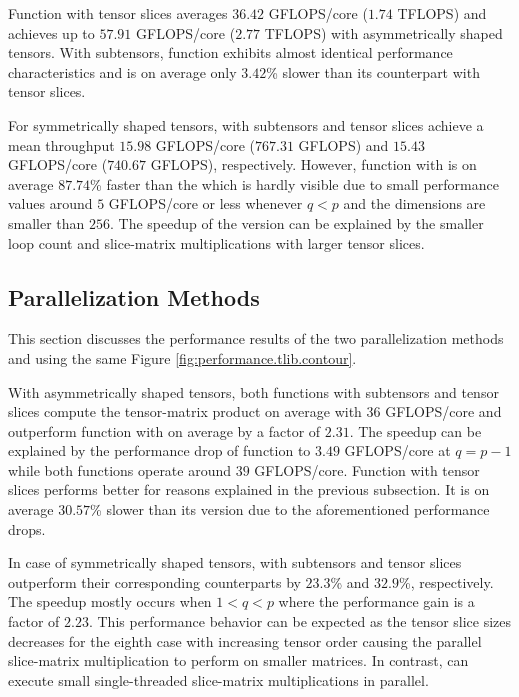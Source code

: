 Function  with tensor slices averages $36.42$ GFLOPS/core ($1.74$ TFLOPS) and achieves up to $57.91$ GFLOPS/core ($2.77$ TFLOPS) with asymmetrically shaped tensors.
With subtensors, function  exhibits almost identical performance characteristics and is on average only $3.42$\% slower than its counterpart with tensor slices.

For symmetrically shaped tensors,  with subtensors and tensor slices achieve a mean throughput $15.98$ GFLOPS/core ($767.31$ GFLOPS) and $15.43$ GFLOPS/core ($740.67$ GFLOPS), respectively.
However, function  with  is on average $87.74$\% faster than the  which is hardly visible due to small performance values around $5$ GFLOPS/core or less whenever $q<p$ and the dimensions are smaller than $256$.
The speedup of the  version can be explained by the smaller loop count and slice-matrix multiplications with larger tensor slices.


\subsection{Parallelization Methods}
This section discusses the performance results of the two parallelization methods  and  using the same Figure \ref{fig:performance.tlib.contour}.

With asymmetrically shaped tensors, both  functions with subtensors and tensor slices compute the tensor-matrix product on average with $36$ GFLOPS/core and outperform function  with  on average by a factor of $2.31$.
The speedup can be explained by the performance drop of function \allowbreak{} to $3.49$ GFLOPS/core at $q=p-1$ while both  functions operate around $39$ GFLOPS/core.
Function  with tensor slices performs better for reasons explained in the previous subsection.
It is on average $30.57$\% slower than its  version due to the aforementioned performance drops.

In case of symmetrically shaped tensors,  with subtensors and tensor slices outperform their corresponding  counterparts by $23.3$\% and $32.9$\%, respectively.
The speedup mostly occurs when $1<q<p$ where the performance gain is a factor of $2.23$.
This performance behavior can be expected as the tensor slice sizes decreases for the eighth case with increasing tensor order causing the parallel slice-matrix multiplication to perform on smaller matrices.
In contrast,  can execute small single-threaded slice-matrix multiplications in parallel.

